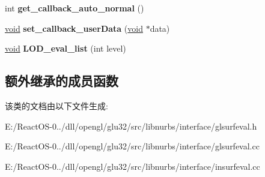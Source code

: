 \begin{DoxyCompactItemize}
int {\bfseries get\+\_\+callback\+\_\+auto\+\_\+normal} ()
\item 
\mbox{\label{class_open_g_l_surface_evaluator_a584e0b55082a1ee981785f9c661fc007}} 
\hyperlink{interfacevoid}{void} {\bfseries set\+\_\+callback\+\_\+user\+Data} (\hyperlink{interfacevoid}{void} $\ast$data)
\item 
\mbox{\label{class_open_g_l_surface_evaluator_a5f8181e3e9e2d1ff14813754ae5e083b}} 
\hyperlink{interfacevoid}{void} {\bfseries L\+O\+D\+\_\+eval\+\_\+list} (int level)
\end{DoxyCompactItemize}
\subsection*{额外继承的成员函数}


该类的文档由以下文件生成\+:\begin{DoxyCompactItemize}
\item 
E\+:/\+React\+O\+S-\/0../dll/opengl/glu32/src/libnurbs/interface/glsurfeval.\+h\item 
E\+:/\+React\+O\+S-\/0../dll/opengl/glu32/src/libnurbs/interface/glsurfeval.\+cc\item 
E\+:/\+React\+O\+S-\/0../dll/opengl/glu32/src/libnurbs/interface/insurfeval.\+cc\end{DoxyCompactItemize}
